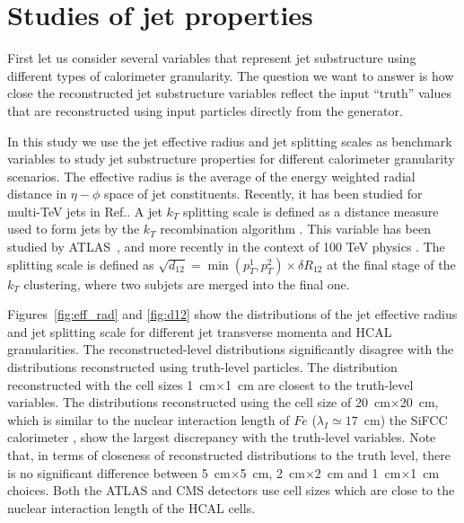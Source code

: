 \section{Studies of jet properties}
\label{sec:jets}

First let us consider several variables that represent jet substructure using different types
of calorimeter granularity. The question we want to answer is how close the reconstructed
jet substructure variables reflect the input ``truth'' values  that are reconstructed using 
input particles directly from the \pythia generator.

In this study we use the jet effective radius and jet splitting scales as benchmark variables
to study jet substructure properties for different calorimeter granularity scenarios. 
The effective radius is the average of the energy weighted radial distance in $\eta-\phi$ space of jet constituents.
Recently, it has been studied for multi-TeV jets in Ref.\cite{Auerbach:2014xua}.
A jet $k_T$ splitting scale \cite{Butterworth:2002tt} is defined as a distance measure
used to form jets by the $k_T$ recombination
algorithm \cite{Catani1993187,Ellis:1993tq}.
This variable has been studied by ATLAS~\cite{ATLAS:2012am}, and more recently in the context of 100 TeV physics \cite{Auerbach:2014xua}.
The splitting scale is defined as 
$\sqrt{d_{12}}=\min(p_T^1,p_T^2) \times \delta R_{12}$ \cite{ATLAS:2012am} at the final stage of the $k_T$ clustering, where two subjets are merged into the final one.

Figures~\ref{fig:eff_rad} and  \ref{fig:d12} show the distributions of 
the jet effective radius and jet splitting scale for  different jet transverse momenta and HCAL granularities.
The reconstructed-level distributions significantly disagree with the distributions  
reconstructed using truth-level particles. The distribution reconstructed with the cell
sizes 1~cm$\times$1~cm are closest to the truth-level variables. The distributions 
reconstructed using the cell size of 20~cm$\times$20~cm, which is similar to the nuclear interaction length
of $Fe$ ($\lambda_I\simeq 17$~cm) the SiFCC calorimeter  \cite{Chekanov:2016ppq}, show the largest discrepancy with the
truth-level variables. Note that, in terms of closeness of reconstructed distributions to the truth level, 
there is no significant difference between 5~cm$\times$5~cm,  2~cm$\times$2~cm and  1~cm$\times$1~cm choices. 
Both the ATLAS and CMS detectors use cell sizes which are close to the nuclear interaction length of
the HCAL cells. 

